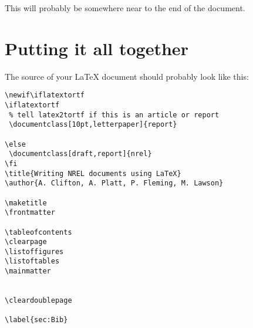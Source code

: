 This will probably be somewhere near to the end of the document.

\section{Putting it all together}
The source of your LaTeX document should probably look like this:

\begin{verbatim}
\newif\iflatextortf
\iflatextortf
 % tell latex2tortf if this is an article or report
 \documentclass[10pt,letterpaper]{report}
 
\else
 \documentclass[draft,report]{nrel} 
\fi
\title{Writing NREL documents using LaTeX}
\author{A. Clifton, A. Platt, P. Fleming, M. Lawson}

\maketitle
\frontmatter

\tableofcontents
\clearpage
\listoffigures
\listoftables
\mainmatter


\cleardoublepage

\label{sec:Bib}


\end{verbatim}

